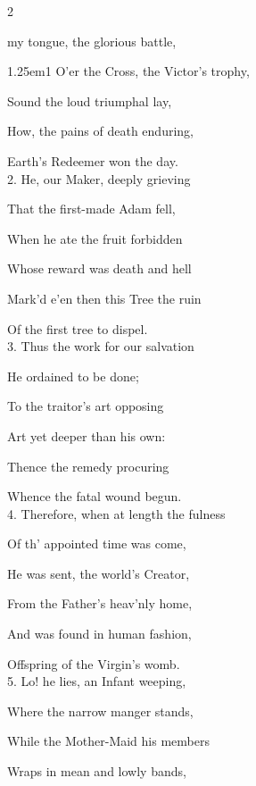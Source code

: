 \mattins


\begin{paracol}{2}
\mattinsInvitatoryHymn

 my tongue, the glorious battle,

\begin{hangparas}{1.25em}{1}
O'er the Cross, the Victor's trophy,

Sound the loud triumphal lay,

How, the pains of death enduring,

Earth's Redeemer won the day.\\

2. He, our Maker, deeply grieving

That the first-made Adam fell,

When he ate the fruit forbidden

Whose reward was death and hell

Mark'd e'en then this Tree the ruin

Of the first tree to dispel.\\

3. Thus the work for our salvation

He ordained to be done;

To the traitor's art opposing

Art yet deeper than his own:

Thence the remedy procuring

Whence the fatal wound begun.\\

4. Therefore, when at length the fulness

Of th' appointed time was come,

He was sent, the world's Creator,

From the Father's heav'nly home,

And was found in human fashion,

Offspring of the Virgin's womb.\\

5. Lo! he lies, an Infant weeping,

Where the narrow manger stands,

While the Mother-Maid his members

Wraps in mean and lowly bands,


\end{hangparas}
\end{paracol}
